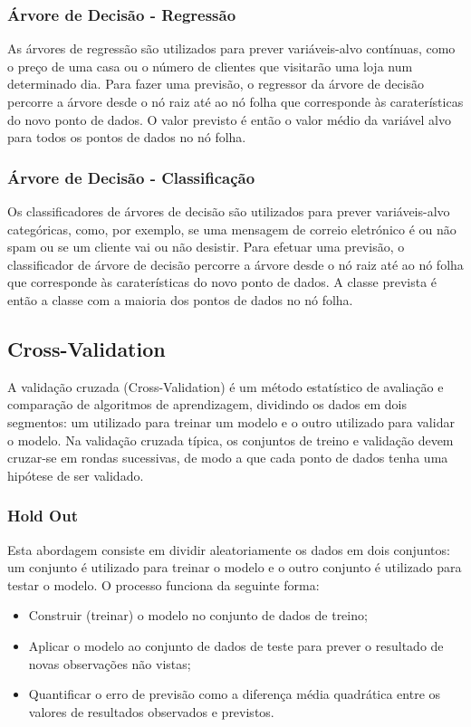 \documentclass[conference]{IEEEtran}
\begin{document}
\subsubsection{Árvore de Decisão - Regressão}

As árvores de regressão são utilizados para prever variáveis-alvo contínuas, como o preço de uma casa ou o número de clientes que visitarão uma loja num determinado dia. Para fazer uma previsão, o regressor da árvore de decisão percorre a árvore desde o nó raiz até ao nó folha que corresponde às caraterísticas do novo ponto de dados. O valor previsto é então o valor médio da variável alvo para todos os pontos de dados no nó folha. \cite{ohekar_what_2023}

\medskip
\subsubsection{Árvore de Decisão - Classificação}

Os classificadores de árvores de decisão são utilizados para prever variáveis-alvo categóricas, como, por exemplo, se uma mensagem de correio eletrónico é ou não spam ou se um cliente vai ou não desistir. Para efetuar uma previsão, o classificador de árvore de decisão percorre a árvore desde o nó raiz até ao nó folha que corresponde às caraterísticas do novo ponto de dados. A classe prevista é então a classe com a maioria dos pontos de dados no nó folha. \cite{ohekar_what_2023}

\subsection{Cross-Validation}

A validação cruzada (Cross-Validation) é um método estatístico de avaliação e comparação de algoritmos de aprendizagem, dividindo os dados em dois segmentos: um utilizado para treinar um modelo e o outro utilizado para validar o modelo. Na validação cruzada típica, os conjuntos de treino e validação devem cruzar-se em rondas sucessivas, de modo a que cada ponto de dados tenha uma hipótese de ser validado. \cite{refaeilzadeh_cross-validation_2009}

\medskip
\subsubsection{Hold Out}

Esta abordagem consiste em dividir aleatoriamente os dados em dois conjuntos: um conjunto é utilizado para treinar o modelo e o outro conjunto é utilizado para testar o modelo. O processo funciona da seguinte forma: 
\begin{itemize}
	\item Construir (treinar) o modelo no conjunto de dados de treino; 
	\item Aplicar o modelo ao conjunto de dados de teste para prever o resultado de novas observações não vistas; 
	\item Quantificar o erro de previsão como a diferença média quadrática entre os valores de resultados observados e previstos. \cite{madureira2024cv}
\end{itemize}
\end{document}
